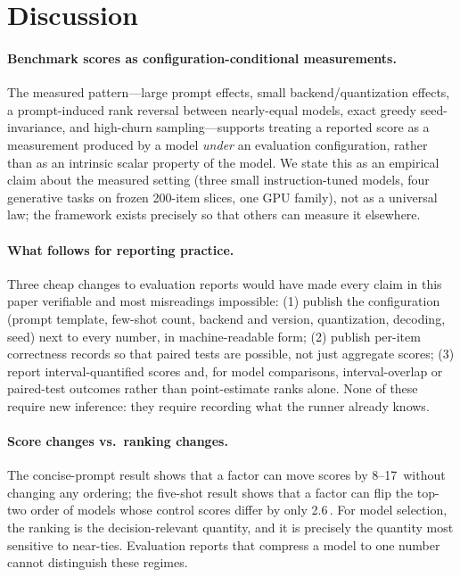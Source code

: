 \section{Discussion}
\label{sec:discussion}

\paragraph{Benchmark scores as configuration-conditional measurements.}
The measured pattern---large prompt effects, small backend/quantization
effects, a prompt-induced rank reversal between nearly-equal models, exact
greedy seed-invariance, and high-churn sampling---supports treating a
reported score as a measurement produced by a model \emph{under} an
evaluation configuration, rather than as an intrinsic scalar property of
the model. We state this as an empirical claim about the measured setting
(three small instruction-tuned models, four generative tasks on frozen
200-item slices, one GPU family), not as a universal law; the framework
exists precisely so that others can measure it elsewhere.

\paragraph{What follows for reporting practice.}
Three cheap changes to evaluation reports would have made every claim in
this paper verifiable and most misreadings impossible: (1) publish the
configuration (prompt template, few-shot count, backend and version,
quantization, decoding, seed) next to every number, in machine-readable
form; (2) publish per-item correctness records so that paired tests are
possible, not just aggregate scores; (3) report interval-quantified scores
and, for model comparisons, interval-overlap or paired-test outcomes rather
than point-estimate ranks alone. None of these require new inference: they
require recording what the runner already knows.

\paragraph{Score changes vs.\ ranking changes.}
The concise-prompt result shows that a factor can move scores by 8--17\,\pp{}
without changing any ordering; the five-shot result shows that a factor can
flip the top-two order of models whose control scores differ by only
2.6\,\pp. For model selection, the ranking is the decision-relevant quantity,
and it is precisely the quantity most sensitive to near-ties. Evaluation
reports that compress a model to one number cannot distinguish these
regimes.
